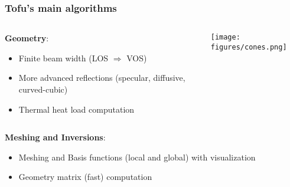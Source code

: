 \documentclass[10pt]{beamer}
\begin{document}
\begin{frame}
\frametitle{Tofu's main algorithms}


\begin{columns}
\begin{column}{0.6\textwidth}
\textbf{Geometry}:
	\begin{itemize}
	\item Finite beam width (LOS $\Rightarrow$ VOS)
	\item More advanced reflections (specular, diffusive, curved-cubic)
	\item Thermal heat load computation
	\end{itemize}
\end{column}
\begin{column}{0.4\textwidth}

\begin{center}
	\hspace{-0.5cm}\texttt{[image: figures/cones.png]}
\end{center}
\end{column}
\end{columns}

\vspace{0.2cm}
\textbf{Meshing and Inversions}:
\begin{itemize}
	\item Meshing and Basis functions (local and global) with visualization
	
	\item Geometry matrix (fast) computation
\end{itemize}

\end{frame}
\end{document}
